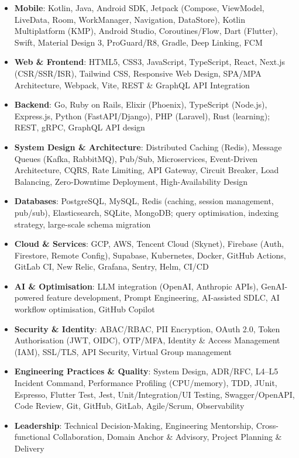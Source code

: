 \documentclass[10pt]{article}
\begin{document}
\begin{itemize}
\item \textbf{Mobile}: Kotlin, Java, Android SDK, Jetpack (Compose, ViewModel, LiveData, Room, WorkManager, Navigation, DataStore), Kotlin Multiplatform (KMP), Android Studio, Coroutines/Flow, Dart (Flutter), Swift, Material Design 3, ProGuard/R8, Gradle, Deep Linking, FCM
\item \textbf{Web \& Frontend}: HTML5, CSS3, JavaScript, TypeScript, React, Next.js (CSR/SSR/ISR), Tailwind CSS, Responsive Web Design, SPA/MPA Architecture, Webpack, Vite, REST \& GraphQL API Integration
\item \textbf{Backend}: Go, Ruby on Rails, Elixir (Phoenix), TypeScript (Node.js), Express.js, Python (FastAPI/Django), PHP (Laravel), Rust (learning); REST, gRPC, GraphQL API design
\item \textbf{System Design \& Architecture}: Distributed Caching (Redis), Message Queues (Kafka, RabbitMQ), Pub/Sub, Microservices, Event-Driven Architecture, CQRS, Rate Limiting, API Gateway, Circuit Breaker, Load Balancing, Zero-Downtime Deployment, High-Availability Design
\item \textbf{Databases}: PostgreSQL, MySQL, Redis (caching, session management, pub/sub), Elasticsearch, SQLite, MongoDB; query optimisation, indexing strategy, large-scale schema migration
\item \textbf{Cloud \& Services}: GCP, AWS, Tencent Cloud (Skynet), Firebase (Auth, Firestore, Remote Config), Supabase, Kubernetes, Docker, GitHub Actions, GitLab CI, New Relic, Grafana, Sentry, Helm, CI/CD
\item \textbf{AI \& Optimisation}: LLM integration (OpenAI, Anthropic APIs), GenAI-powered feature development, Prompt Engineering, AI-assisted SDLC, AI workflow optimisation, GitHub Copilot
\item \textbf{Security \& Identity}: ABAC/RBAC, PII Encryption, OAuth 2.0, Token Authorisation (JWT, OIDC), OTP/MFA, Identity \& Access Management (IAM), SSL/TLS, API Security, Virtual Group management
\item \textbf{Engineering Practices \& Quality}: System Design, ADR/RFC, L4--L5 Incident Command, Performance Profiling (CPU/memory), TDD, JUnit, Espresso, Flutter Test, Jest, Unit/Integration/UI Testing, Swagger/OpenAPI, Code Review, Git, GitHub, GitLab, Agile/Scrum, Observability
\item \textbf{Leadership}: Technical Decision-Making, Engineering Mentorship, Cross-functional Collaboration, Domain Anchor \& Advisory, Project Planning \& Delivery
\end{itemize}
\end{document}
